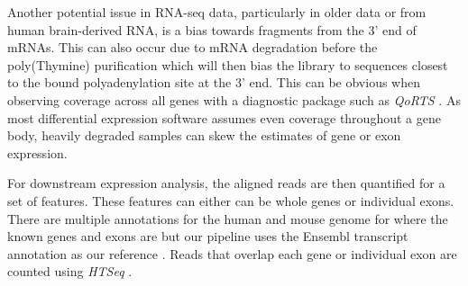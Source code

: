 Another potential issue in RNA-seq data, particularly in older data or from human brain-derived RNA, is a bias towards fragments from the 3' end of mRNAs. This can also occur due to mRNA degradation before the poly(Thymine) purification which will then bias the library to sequences closest to the bound polyadenylation site at the 3' end. This can be obvious when observing coverage across all genes with a diagnostic package such as \textit{QoRTS} \citep{Hartley2015a}. As most differential expression software assumes even coverage throughout a gene body, heavily degraded samples can skew the estimates of gene or exon expression.

For downstream expression analysis, the aligned reads are then quantified for a set of features. These features can either can be whole genes or individual exons. There are multiple annotations for the human and mouse genome for where the known genes and exons are but our pipeline uses the Ensembl transcript annotation as our reference \citep{Cunningham2015}. Reads that overlap each gene or individual exon are counted using \textit{HTSeq} \citep{Anders2015-wz}.



